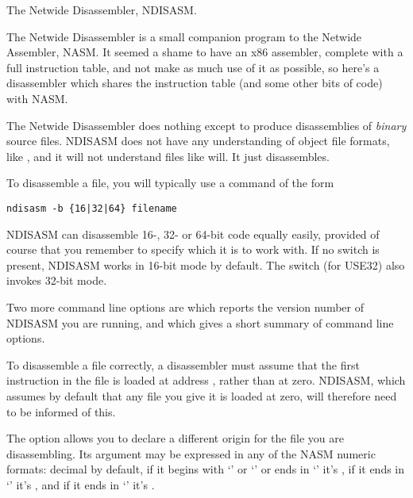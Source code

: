 %
%

The Netwide Disassembler, NDISASM.


The Netwide Disassembler is a small companion program to the Netwide
Assembler, NASM. It seemed a shame to have an x86 assembler,
complete with a full instruction table, and not make as much use of
it as possible, so here's a disassembler which shares the
instruction table (and some other bits of code) with NASM.

The Netwide Disassembler does nothing except to produce
disassemblies of \emph{binary} source files. NDISASM does not have any
understanding of object file formats, like , and it will
not understand  files like  will. It just
disassembles.


To disassemble a file, you will typically use a command of the form

\begin{lstlisting}
ndisasm -b {16|32|64} filename
\end{lstlisting}

NDISASM can disassemble 16-, 32- or 64-bit code equally easily,
provided of course that you remember to specify which it is to work
with. If no  switch is present, NDISASM works in 16-bit mode
by default. The  switch (for USE32) also invokes 32-bit mode.

Two more command line options are  which reports the version
number of NDISASM you are running, and  which gives a short
summary of command line options.


To disassemble a  file correctly, a disassembler must
assume that the first instruction in the file is loaded at address
, rather than at zero. NDISASM, which assumes by default
that any file you give it is loaded at zero, will therefore need
to be informed of this.

The  option allows you to declare a different origin
for the file you are disassembling. Its argument may be expressed
in any of the NASM numeric formats: decimal by default, if it begins
with `\code{\$}' or `' or ends in `' it's ,
if it ends in `' it's , and if it ends in
`' it's .

